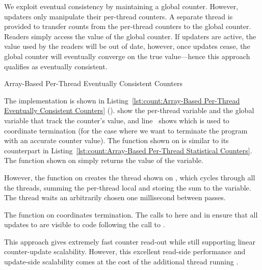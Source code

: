 We exploit eventual consistency by maintaining a global counter.
However, updaters only manipulate their per-thread counters.
A separate thread is provided to transfer counts from the per-thread
counters to the global counter.
Readers simply access the value of the global counter.
If updaters are active, the value used by the readers will be out of
date, however, once updates cease, the global counter will eventually
converge on the true value---hence this approach qualifies as
eventually consistent.

\begin{listing}
\caption{Array-Based Per-Thread Eventually Consistent Counters}
\label{lst:count:Array-Based Per-Thread Eventually Consistent Counters}
\end{listing}

\begin{fcvref}
The implementation is shown in
Listing~\ref{lst:count:Array-Based Per-Thread Eventually Consistent Counters}
().
show the per-thread variable and the global variable that
track the counter's value, and line~ shows 
which is used to coordinate termination (for the case where we want
to terminate the program with an accurate counter value).
The  function shown on
 is similar to its
counterpart in
Listing~\ref{lst:count:Array-Based Per-Thread Statistical Counters}.
The  function shown on
 simply returns the
value of the  variable.

However, the  function on
creates the  thread shown on
, which
cycles through all the threads,
summing the per-thread local  and storing the
sum to the  variable.
The  thread waits an arbitrarily chosen one millisecond
between passes.

The  function on
 coordinates termination.
The calls to  here and in  ensure
that all updates to  are visible to code following
the call to .

This approach gives extremely fast counter read-out while still
supporting linear counter-update scalability.
However, this excellent read-side performance and update-side scalability
comes at the cost of the additional thread running .
\end{fcvref}

